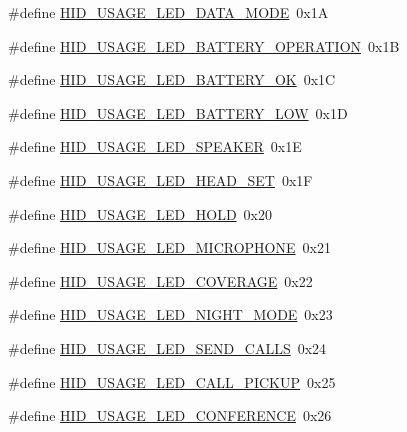 \begin{DoxyCompactItemize}
\item 
\#define \hyperlink{group___u_s_b_d___h_i_d_ga9fb720115913b930bb78194a33179dca}{H\+I\+D\+\_\+\+U\+S\+A\+G\+E\+\_\+\+L\+E\+D\+\_\+\+D\+A\+T\+A\+\_\+\+M\+O\+DE}~0x1A
\item 
\#define \hyperlink{group___u_s_b_d___h_i_d_ga271a64b1cc255d53e0c8a6faaa839a9d}{H\+I\+D\+\_\+\+U\+S\+A\+G\+E\+\_\+\+L\+E\+D\+\_\+\+B\+A\+T\+T\+E\+R\+Y\+\_\+\+O\+P\+E\+R\+A\+T\+I\+ON}~0x1B
\item 
\#define \hyperlink{group___u_s_b_d___h_i_d_gaf8763b6fea392885b88bb33268958830}{H\+I\+D\+\_\+\+U\+S\+A\+G\+E\+\_\+\+L\+E\+D\+\_\+\+B\+A\+T\+T\+E\+R\+Y\+\_\+\+OK}~0x1C
\item 
\#define \hyperlink{group___u_s_b_d___h_i_d_ga48f4348d9621af4e15ea165120da03be}{H\+I\+D\+\_\+\+U\+S\+A\+G\+E\+\_\+\+L\+E\+D\+\_\+\+B\+A\+T\+T\+E\+R\+Y\+\_\+\+L\+OW}~0x1D
\item 
\#define \hyperlink{group___u_s_b_d___h_i_d_ga8624c57f4679741495fa8d327071a019}{H\+I\+D\+\_\+\+U\+S\+A\+G\+E\+\_\+\+L\+E\+D\+\_\+\+S\+P\+E\+A\+K\+ER}~0x1E
\item 
\#define \hyperlink{group___u_s_b_d___h_i_d_ga55628e40adac70d0ebf16913ff7fa8e4}{H\+I\+D\+\_\+\+U\+S\+A\+G\+E\+\_\+\+L\+E\+D\+\_\+\+H\+E\+A\+D\+\_\+\+S\+ET}~0x1F
\item 
\#define \hyperlink{group___u_s_b_d___h_i_d_gaaf5fe8bc99060dfc70ed7961592591eb}{H\+I\+D\+\_\+\+U\+S\+A\+G\+E\+\_\+\+L\+E\+D\+\_\+\+H\+O\+LD}~0x20
\item 
\#define \hyperlink{group___u_s_b_d___h_i_d_ga2875a5dab91a823cd139a9f1222fc411}{H\+I\+D\+\_\+\+U\+S\+A\+G\+E\+\_\+\+L\+E\+D\+\_\+\+M\+I\+C\+R\+O\+P\+H\+O\+NE}~0x21
\item 
\#define \hyperlink{group___u_s_b_d___h_i_d_ga5b3c58fa1201bedf7768c49681dae586}{H\+I\+D\+\_\+\+U\+S\+A\+G\+E\+\_\+\+L\+E\+D\+\_\+\+C\+O\+V\+E\+R\+A\+GE}~0x22
\item 
\#define \hyperlink{group___u_s_b_d___h_i_d_ga896fc5e9fef8c77f6bc9632d225a3172}{H\+I\+D\+\_\+\+U\+S\+A\+G\+E\+\_\+\+L\+E\+D\+\_\+\+N\+I\+G\+H\+T\+\_\+\+M\+O\+DE}~0x23
\item 
\#define \hyperlink{group___u_s_b_d___h_i_d_ga54c05842cb29924ec44436bc1faa36c0}{H\+I\+D\+\_\+\+U\+S\+A\+G\+E\+\_\+\+L\+E\+D\+\_\+\+S\+E\+N\+D\+\_\+\+C\+A\+L\+LS}~0x24
\item 
\#define \hyperlink{group___u_s_b_d___h_i_d_gaf351566a10977d6f73f001857f00b8be}{H\+I\+D\+\_\+\+U\+S\+A\+G\+E\+\_\+\+L\+E\+D\+\_\+\+C\+A\+L\+L\+\_\+\+P\+I\+C\+K\+UP}~0x25
\item 
\#define \hyperlink{group___u_s_b_d___h_i_d_gaeca2c05d89704467b0a6a33055deafd6}{H\+I\+D\+\_\+\+U\+S\+A\+G\+E\+\_\+\+L\+E\+D\+\_\+\+C\+O\+N\+F\+E\+R\+E\+N\+CE}~0x26

\end{DoxyCompactItemize}
